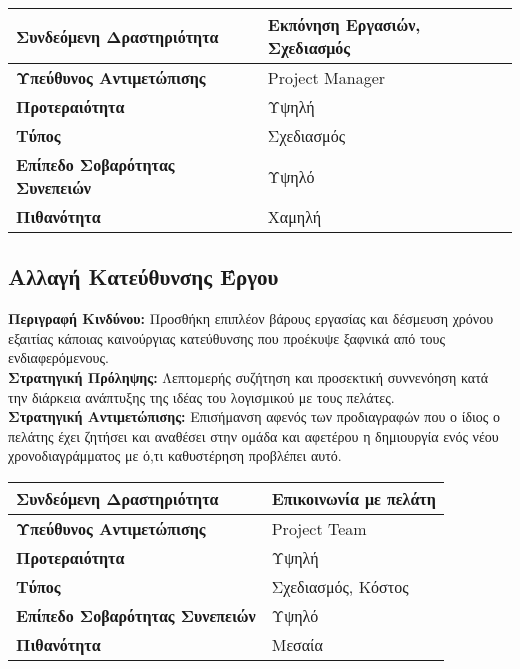 \documentclass{article}
\newcommand\T{\rule{0pt}{2.6ex}}       %
\newcommand\B{\rule[-1.2ex]{0pt}{0pt}}
\begin{document}
\newpage
 
 \begin{center}
     \begin{tabular}{|l|l|}
     \hline
      \textbf{Συνδεόμενη Δραστηριότητα}   & Εκπόνηση Εργασιών, Σχεδιασμός \T\B \\ 
      \hline
      \textbf{Υπεύθυνος Αντιμετώπισης} & Project Manager \T\B \\
      \hline
      \textbf{Προτεραιότητα} & Υψηλή \T\B \\
      \hline
      \textbf{Τύπος} & Σχεδιασμός \T\B \\
      \hline
      \textbf{Επίπεδο Σοβαρότητας Συνεπειών} & Υψηλό \T\B \\
      \hline
      \textbf{Πιθανότητα} & Χαμηλή \T\B \\
      \hline
     \end{tabular}
 \end{center}
   
   
\subsection{Αλλαγή Κατεύθυνσης Έργου}

\textbf{Περιγραφή Κινδύνου:} Προσθήκη επιπλέον βάρους εργασίας και δέσμευση χρόνου εξαιτίας κάποιας καινούργιας κατεύθυνσης που προέκυψε ξαφνικά από τους ενδιαφερόμενους.\\

\textbf{Στρατηγική Πρόληψης:} Λεπτομερής συζήτηση και προσεκτική συννενόηση κατά την διάρκεια ανάπτυξης της ιδέας του λογισμικού με τους πελάτες.\\


\textbf{Στρατηγική Αντιμετώπισης:} Επισήμανση αφενός των προδιαγραφών που ο ίδιος ο πελάτης έχει ζητήσει και αναθέσει στην ομάδα και αφετέρου η δημιουργία ενός νέου χρονοδιαγράμματος με ό,τι καθυστέρηση προβλέπει αυτό.\\
 
 \begin{center}
     \begin{tabular}{|l|l|}
     \hline
      \textbf{Συνδεόμενη Δραστηριότητα}   & Επικοινωνία με πελάτη \T\B \\ 
      \hline
      \textbf{Υπεύθυνος Αντιμετώπισης} & Project Team \T\B \\
      \hline
      \textbf{Προτεραιότητα} & Υψηλή \T\B \\
      \hline
      \textbf{Τύπος} & Σχεδιασμός, Κόστος \T\B \\
      \hline
      \textbf{Επίπεδο Σοβαρότητας Συνεπειών} & Υψηλό \T\B \\
      \hline
      \textbf{Πιθανότητα} & Μεσαία \T\B \\
      \hline
     \end{tabular}
 \end{center}
\end{document}
